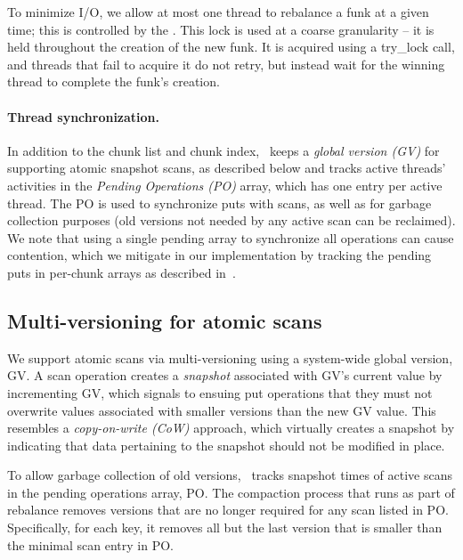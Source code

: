 To minimize I/O, we allow at most one thread to rebalance a funk at a given time; this is controlled by 
the  . 
This lock is used at a coarse granularity -- it is held throughout the creation of the new funk. 
It is acquired using a try\_lock call, and threads that fail to acquire it do not retry, but instead wait for the winning thread 
to complete the funk's creation.

\paragraph{Thread synchronization.}

In addition to the chunk list and chunk index, \sys\ keeps a \emph{global version (GV)} for supporting atomic snapshot scans, as described below and tracks active threads' activities in the 
\emph{Pending Operations (PO)} array, which has one entry per active thread. 
The PO is used to synchronize puts with scans, as well as for  garbage collection purposes (old 
versions not needed by any active scan can be reclaimed).
We note that using a single pending array to synchronize all operations can cause contention, which we
mitigate in our implementation by tracking the pending puts in per-chunk arrays as described in~\cite{kiwi}. 

\subsection{Multi-versioning for atomic scans}
\label{ssec:scans}


We support atomic scans via multi-versioning using a system-wide global version, GV. 
A scan operation creates a \emph{snapshot} associated with GV's current value by incrementing GV, 
which signals to ensuing put operations that they must not overwrite values associated with 
smaller versions than the new GV value.
This resembles a \emph{copy-on-write (CoW)} approach, which virtually creates a snapshot by 
indicating that data pertaining to the snapshot should not be modified in place.  

To allow garbage collection of old versions, \sys\  tracks snapshot times of 
active scans in the pending operations array, PO.
The compaction process that runs as part of rebalance removes versions that are no longer required for any  
scan listed in PO. Specifically, for each key, it removes all but the last version that is smaller than the minimal
scan entry in PO. 

